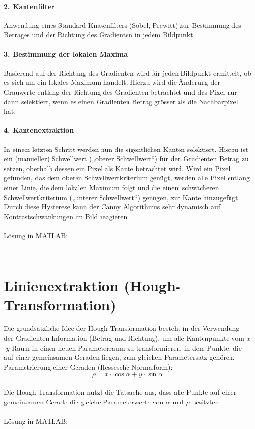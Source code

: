\paragraph{2. Kantenfilter\\}
Anwendung eines Standard Knatenfilters (Sobel, Prewitt) zur Bestimmung des Betrages und der Richtung des Gradienten in jedem Bildpunkt.
\paragraph{3. Bestimmung der lokalen Maxima\\}
Basierend auf der Richtung des Gradienten wird für jeden Bildpunkt ermittelt, ob es sich um ein lokales Maximum handelt.
Hierzu wird die Änderung der Grauwerte entlang der Richtung des Gradienten betrachtet und das Pixel nur dann selektiert, 
wenn es einen Gradienten Betrag grösser als die Nachbarpixel hat.
\paragraph{4. Kantenextraktion\\}
In einem letzten Schritt werden nun die eigentlichen Kanten selektiert.
Hierzu ist ein (manueller) Schwellwert („oberer Schwellwert“) für den Gradienten Betrag zu setzen, oberhalb dessen ein Pixel als Kante betrachtet wird. 
Wird ein Pixel gefunden, das dem oberen Schwellwertkriterium genügt, werden alle Pixel entlang einer Linie, die dem lokalen Maximum folgt und die einem schwächeren Schwellwertkriterium („unterer Schwellwert“) genügen, zur Kante hinzugefügt. 
Durch diese Hysterese kann der Canny Algorithmus sehr dynamisch auf Kontrastschwankungen im Bild reagieren.
~\\\\
Lösung in MATLAB:
\lstset{language=Matlab}

~\\
\section{Linienextraktion (Hough-Transformation)}
Die grundsätzliche Idee der Hough Transformation besteht in der Verwendung der Gradienten Information (Betrag und Richtung), um alle Kantenpunkte vom $x$-$y$-Raum in einen neuen Parameterraum zu transformieren, in dem Punkte, die auf einer gemeinsamen Geraden liegen, zum gleichen Parametersatz gehören.\\
Parametrierung einer Geraden (Hessesche Normalform):
\[
	\rho = x \cdot \cos \alpha + y \cdot \sin \alpha
\]
~\\
Die Hough Transformation nutzt die Tatsache aus, dass alle Punkte auf einer gemeinsamen Gerade die gleiche Parameterwerte von $\alpha$ und $\rho$ besitzten.
~\\\\
Lösung in MATLAB:
\lstset{language=Matlab}

~\\

